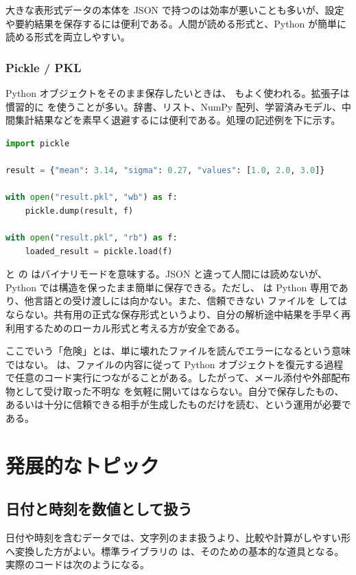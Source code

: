 大きな表形式データの本体を JSON で持つのは効率が悪いことも多いが、設定や要約結果を保存するには便利である。人間が読める形式と、Python が簡単に読める形式を両立しやすい。

\subsubsection{Pickle / PKL}

Python オブジェクトをそのまま保存したいときは、 もよく使われる。拡張子は慣習的に  を使うことが多い。辞書、リスト、NumPy 配列、学習済みモデル、中間集計結果などを素早く退避するには便利である。処理の記述例を下に示す。

\begin{lstlisting}[language=Python]
import pickle

result = {"mean": 3.14, "sigma": 0.27, "values": [1.0, 2.0, 3.0]}

with open("result.pkl", "wb") as f:
    pickle.dump(result, f)

with open("result.pkl", "rb") as f:
    loaded_result = pickle.load(f)
\end{lstlisting}

 と  の  はバイナリモードを意味する。JSON と違って人間には読めないが、Python では構造を保ったまま簡単に保存できる。ただし、 は Python 専用であり、他言語との受け渡しには向かない。また、信頼できない  ファイルを  してはならない。共有用の正式な保存形式というより、自分の解析途中結果を手早く再利用するためのローカル形式と考える方が安全である。

ここでいう「危険」とは、単に壊れたファイルを読んでエラーになるという意味ではない。 は、ファイルの内容に従って Python オブジェクトを復元する過程で任意のコード実行につながることがある。したがって、メール添付や外部配布物として受け取った不明な  を気軽に開いてはならない。自分で保存したもの、あるいは十分に信頼できる相手が生成したものだけを読む、という運用が必要である。

\section{発展的なトピック}

\subsection{日付と時刻を数値として扱う}

日付や時刻を含むデータでは、文字列のまま扱うより、比較や計算がしやすい形へ変換した方がよい。標準ライブラリの  は、そのための基本的な道具となる。実際のコードは次のようになる。

